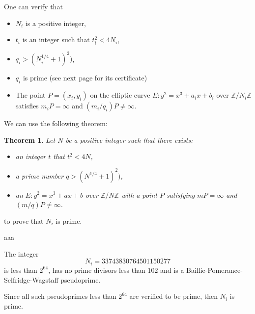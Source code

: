 \documentclass[12pt]{extarticle}
\newtheorem*{theorem*}{Theorem}
\begin{document}
\begin{multicols}{3}
\noindent One can verify that
\begin{itemize}
\item $N_i$ is a positive integer,
\item $t_i$ is an integer such that $t_i^2 < 4N_i$,
\item $q_i > (N_i^{1/4} + 1)^2)$,
\item $q_i$ is prime (see next page for its certificate)
\item The point $P = (x_i, y_i)$ on the elliptic curve $E: y^2 = x^3 + a_ix + b_i$ over $\mathbb{Z}/{N_i}\mathbb{Z}$ satisfies $m_iP = \infty$ and $(m_i/q_i)P \neq \infty$.
\end{itemize}
\columnbreak
\noindent We can use the following theorem:
\begin{theorem*}
Let $N$ be a positive integer such that there exists:
\begin{itemize}
\item an integer $t$ that $t^2 < 4N$,
\item a prime number $q > (N^{1/4} + 1)^2)$,
\item an $E: y^2 = x^3 + ax + b$ over $\mathbb{Z}/{N}\mathbb{Z}$ with a point $P$ satisfying $mP = \infty$ and $(m/q)P \neq \infty$.
\end{itemize}
\end{theorem*}
\noindent to prove that $N_i$ is prime.

\columnbreak

aaa
\end{multicols}

\newpage

\pagestyle{empty}
\phantom{a}
\vspace{2em}

\begin{center}
{\Huge {}}
\end{center}
\vspace{2em}

\noindent The integer
{\Huge
$$
N_i = 33743830764501150277
$$
}
is less than $2^{64}$, has no prime divisors less than $102$ and is a Baillie-Pomerance-Selfridge-Wagstaff pseudoprime.

\vspace{2em}
\noindent Since all such pseudoprimes less than $2^{64}$ are verified to be prime, then $N_i$ is prime.
\end{document}
